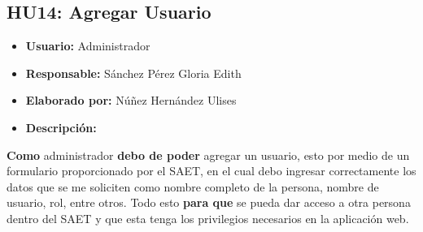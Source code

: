 \subsection{HU14: Agregar Usuario}
\begin{itemize}
	\item \textbf{Usuario:} Administrador
	\item \textbf{Responsable:} Sánchez Pérez Gloria Edith
	\item \textbf{Elaborado por:} Núñez Hernández Ulises
	\item \textbf{Descripción:}
\end{itemize}
\textbf{Como} administrador \textbf{debo de poder} agregar un usuario, esto por medio de un formulario proporcionado por el SAET, en el cual debo ingresar correctamente los datos que se me soliciten como nombre completo de la persona, nombre de usuario, rol, entre otros. Todo esto \textbf{para que} se pueda dar acceso a otra persona dentro del SAET y que esta tenga los privilegios necesarios en la aplicación web.